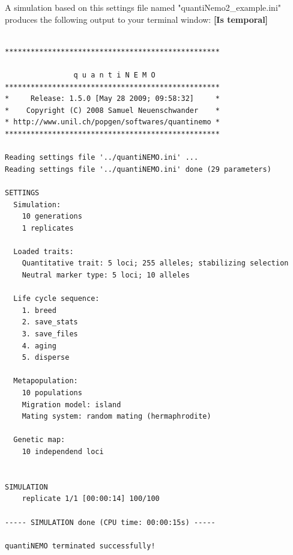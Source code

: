 \documentclass[letterpaper,12pt,oneside]{book}
\newcommand{\tbc}[1]{\small {\bf \color{red} [Is temporal]} \normalsize} %
\begin{document}
A simulation based on this settings file named "quantiNemo2\_example.ini" produces the following output to your terminal window:
\tbc{}
\begin{lstlisting}[frame=single]

**************************************************

                q u a n t i N E M O
**************************************************
*     Release: 1.5.0 [May 28 2009; 09:58:32]     *
*    Copyright (C) 2008 Samuel Neuenschwander    *
* http://www.unil.ch/popgen/softwares/quantinemo *
**************************************************

Reading settings file '../quantiNEMO.ini' ...
Reading settings file '../quantiNEMO.ini' done (29 parameters)

SETTINGS
  Simulation:
    10 generations
    1 replicates

  Loaded traits:
    Quantitative trait: 5 loci; 255 alleles; stabilizing selection
    Neutral marker type: 5 loci; 10 alleles

  Life cycle sequence:
    1. breed
    2. save_stats
    3. save_files
    4. aging
    5. disperse

  Metapopulation:
    10 populations
    Migration model: island
    Mating system: random mating (hermaphrodite)

  Genetic map:
    10 independend loci


SIMULATION
    replicate 1/1 [00:00:14] 100/100

----- SIMULATION done (CPU time: 00:00:15s) -----

quantiNEMO terminated successfully!
\end{lstlisting}
\end{document}
